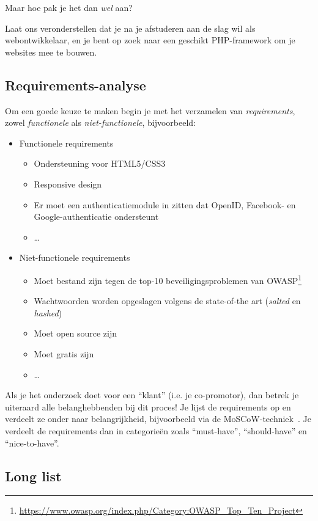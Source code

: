 Maar hoe pak je het dan \emph{wel} aan?

Laat ons veronderstellen dat je na je afstuderen aan de slag wil als webontwikkelaar, en je bent op zoek naar een geschikt PHP-framework om je websites mee te bouwen.

\subsection{Requirements-analyse}
\label{ssec:requirements-analyse}

Om een goede keuze te maken begin je met het verzamelen van \emph{requirements}, zowel \textit{functionele} als \emph{niet-functionele}, bijvoorbeeld:

\begin{itemize}
\item Functionele requirements
  \begin{itemize}
  \item Ondersteuning voor HTML5/CSS3
  \item Responsive design
  \item Er moet een authenticatiemodule in zitten dat OpenID, Facebook- en Google-authenticatie ondersteunt
  \item \ldots
  \end{itemize}
\item Niet-functionele requirements
  \begin{itemize}
  \item Moet bestand zijn tegen de top-10 beveiligingsproblemen van OWASP\footnote{\url{https://www.owasp.org/index.php/Category:OWASP_Top_Ten_Project}}
  \item Wachtwoorden worden opgeslagen volgens de state-of-the art (\emph{salted} en \emph{hashed})
  \item Moet open source zijn
  \item Moet gratis zijn
  \item \ldots
  \end{itemize}
\end{itemize}

Als je het onderzoek doet voor een ``klant'' (i.e. je co-promotor), dan betrek je uiteraard alle belanghebbenden bij dit proces! Je lijst de requirements op en verdeelt ze onder naar belangrijkheid, bijvoorbeeld via de MoSCoW-techniek~\parencite{Nordenstam2014}. Je verdeelt de requirements dan in categorieën zoals ``must-have'', ``should-have'' en ``nice-to-have''.

\subsection{Long list}
\label{ssec:long-list}

